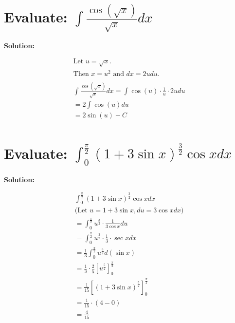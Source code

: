 \documentclass{article}
\begin{document}
\newpage
\section{Evaluate: $\int \frac{\cos(\sqrt{x})}{\sqrt{x}} dx$}

\textbf{Solution:}

\begin{align*}
     & \text{Let } u = \sqrt{x}.                                                            \\
     & \text{Then } x = u^2 \text{ and } dx = 2u du.                                        \\
    \\
     & \int \frac{\cos(\sqrt{x})}{\sqrt{x}} dx = \int \cos(u) \cdot \frac{1}{u} \cdot 2u du \\
     & = 2 \int \cos(u) du                                                                  \\
     & = 2 \sin(u) + C                                                                      \\
\end{align*}

\section{Evaluate: $\int_0^{\frac{\pi}{2}} (1 + 3\sin x)^{\frac{3}{2}} \cos x dx$}

\textbf{Solution:}

\begin{align*}
     & \int_0^{\frac{\pi}{2}} (1 + 3\sin x)^{\frac{3}{2}} \cos x dx                     \\
     & \text{(Let } u = 1 + 3\sin x, du = 3\cos x dx)                                   \\
     & = \int_0^{\frac{\pi}{2}} u^{\frac{3}{2}} \cdot \frac{1}{3\cos x} du              \\
     & = \int_0^{\frac{\pi}{2}} u^{\frac{3}{2}} \cdot \frac{1}{3} \cdot \sec x dx       \\
     & = \frac{1}{3} \int_0^{\frac{\pi}{2}} u^{\frac{3}{2}} d(\sin x)                   \\
     & = \frac{1}{3} \cdot \frac{2}{5} \left[ u^{\frac{5}{2}} \right]_0^{\frac{\pi}{2}} \\
     & = \frac{1}{15} \left[ (1 + 3\sin x)^{\frac{5}{2}} \right]_0^{\frac{\pi}{2}}      \\
     & = \frac{1}{15} \cdot (4 - 0)                                                     \\
     & = {\frac{4}{15}}
\end{align*}
\end{document}
